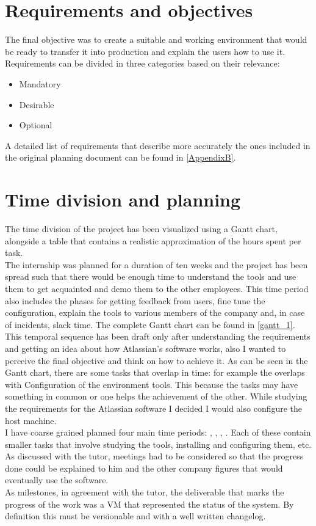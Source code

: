 \section{Requirements and objectives}
	The final objective was to create a suitable and working environment that would be ready to transfer it into production and explain the users how to use it.\\
	Requirements can be divided in three categories based on their relevance:
	\begin{itemize}
		\item Mandatory
		\item Desirable
		\item Optional
	\end{itemize}
	A detailed list of requirements that describe more accurately the ones included in the original planning document can be found in \ref{AppendixB}.
	
\section{Time division and planning}\label{sec:time_planning}
	The time division of the project has been visualized using a Gantt chart, alongside a table that contains a realistic approximation of the hours spent per task.\\
	The internship was planned for a duration of ten weeks and the project has been spread such that there would be enough time to understand the tools and use them to get acquainted and demo them to the other employees.
	This time period also includes the phases for getting feedback from users, fine tune the configuration, explain the tools to various members of the company and, in case of incidents, slack time.
	The complete Gantt chart can be found in \ref{gantt_1}.\\
	This temporal sequence has been draft only after understanding the requirements and getting an idea about how Atlassian's software works, also I wanted to perceive the final objective and think on how to achieve it.
	As can be seen in the Gantt chart, there are some tasks that overlap in time: for example the  overlaps with Configuration of the environment tools.
	This because the tasks may have something in common or one helps the achievement of the other.
	While studying the requirements for the Atlassian software I decided I would also configure the host machine.\\
	I have coarse grained planned four main time periods: , , , .
	Each of these contain smaller tasks that involve studying the tools, installing and configuring them, etc.\\
	As discussed with the tutor, meetings had to be considered so that the progress done could be explained to him and the other company figures that would eventually use the software.\\
	As \gls{milestones}, in agreement with the tutor, the deliverable that marks the progress of the work was a VM that represented the status of the system.
	By definition this must be versionable and with a well written changelog.
	